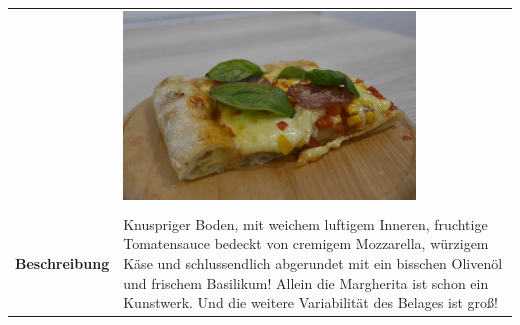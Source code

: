 \documentclass[a4paper, 12pt]{scrbook} 								%
\numberwithin{equation}{section} 									%
\begin{document}
			\begin{tabularx}{\textwidth}{r|L}
										& 	\includegraphics[height = 5cm]{media/pizza.JPG}	\\
										&	\\
				\textbf{Beschreibung}	&	
				Knuspriger Boden, mit weichem luftigem Inneren, fruchtige Tomatensauce bedeckt von cremigem Mozzarella, würzigem Käse und schlussendlich abgerundet mit ein bisschen Olivenöl und frischem Basilikum!
				Allein die Margherita ist schon ein Kunstwerk. Und die weitere Variabilität des Belages ist groß!


\end{tabularx}
\end{document}
